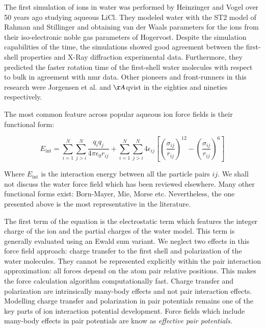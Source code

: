 The first simulation of ions in water was performed by Heinzinger and Vogel over 50 years 
ago studying aqueous LiCl\cite{heinzinger1974molecular}. They modeled water with the ST2 model of 
Rahman and Stillinger\cite{rahman1971molecular} and obtaining van der Waals parameters for the 
ions from their iso-electronic noble gas parameters of 
Hogervost\cite{hogervorst1971transport}. Despite the simulation capabilities of the time, the 
simulations showed good agreement between the first-shell properties and X-Ray diffraction 
experimental data. Furthermore, they predicted the faster rotation time of the 
first-shell water molecules with respect to bulk in agreement with \gls{nmr} data. Other 
pioneers 
and 
front-runners in this research were Jorgensen et 
al.\cite{jorgensen1982quantum,chandrasekhar1984energy,jorgensen1983comparison}
and $\AA{}$qvist\cite{aqvist1990ion}  in the eighties and nineties respectively.  

The most common feature across popular aqueous ion force fields is their functional 
form:

\begin{equation}\label{eqLJ}
E_\text{int}=
\sum_{i=1}^N\sum_{j>i}^N 
\frac{q_iq_j}{4\pi\epsilon_0 r_{ij}}+ 
\sum_{i=1}^N\sum_{j>i}^N
4\epsilon_{ij}\left[\left(\frac{\sigma_{ij}}{r_{ij}}\right)^{12}-\left(\frac{\sigma_{ij}}{r_{ij}}
\right)^6\right]
\end{equation}

Where $E_\text{int}$ is the interaction energy between all the particle pairs $i j$. We shall 
not 
discuss the water force field which has been reviewed 
elsewhere\cite{PhysChemChemPhys_Vega_2011}. Many other functional forms exist: 
Born-Mayer, Mie, Morse etc.\cite{Li2017} Nevertheless, the one presented above is the most 
representative in the literature.  

The first term of the equation is the electrostatic term which features the integer charge 
of the ion and the partial charges of the water model. This term is generally evaluated using an 
Ewald sum variant\cite{frenkel2001understanding}. We neglect two effects in this force field 
approach: charge transfer to the 
first shell and polarization of the water molecules. They 
cannot be represented explicitly within the pair interaction approximation: all forces depend 
on the atom pair relative positions. This makes the force calculation algorithm 
computationally fast. Charge transfer and polarization are intrinsically many-body effects and 
not pair interaction effects. Modelling charge transfer and polarization in pair 
potentials remains one of the key parts of ion interaction potential development. Force fields 
which include many-body effects in pair potentials are know as \textit{effective pair potentials}.

